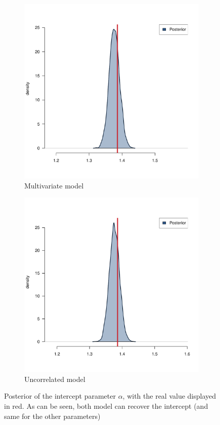 \begin{figure}[htb]
	\centering
	\begin{subfigure}{0.4\textwidth}
		\includegraphics{./Figures/alpha_corr.pdf}
		\caption{Multivariate model}
	\end{subfigure}
	\hfil
	\begin{subfigure}{0.4\textwidth}
		\includegraphics{./Figures/alpha_uncorr.pdf}
		\caption{Uncorrelated model}
	\end{subfigure}
	\caption{Posterior of the intercept parameter \( \alpha \), with the real value displayed in red. As can be seen, both model can recover the intercept (and same for the other parameters)}
	\label{fig::res-params}
\end{figure}


